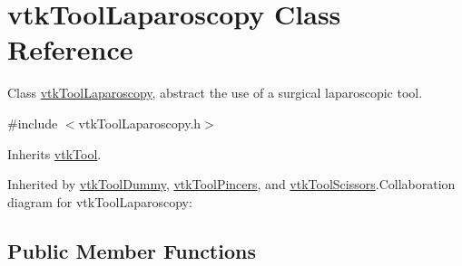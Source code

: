 \hypertarget{classvtkToolLaparoscopy}{
\section{vtkToolLaparoscopy Class Reference}
\label{classvtkToolLaparoscopy}
}


Class \hyperlink{classvtkToolLaparoscopy}{vtkToolLaparoscopy}, abstract the use of a surgical laparoscopic tool.  


{\ttfamily \#include $<$vtkToolLaparoscopy.h$>$}

Inherits \hyperlink{classvtkTool}{vtkTool}.

Inherited by \hyperlink{classvtkToolDummy}{vtkToolDummy}, \hyperlink{classvtkToolPincers}{vtkToolPincers}, and \hyperlink{classvtkToolScissors}{vtkToolScissors}.Collaboration diagram for vtkToolLaparoscopy:\subsection*{Public Member Functions}
